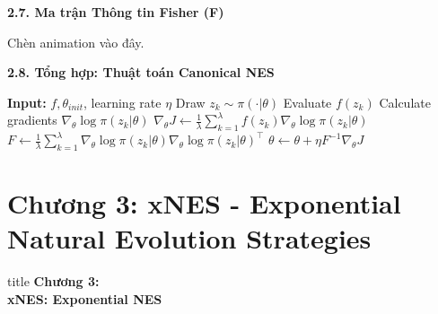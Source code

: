 \documentclass[10pt,xcolor=dvipsnames]{beamer}
\begin{document}
\begin{frame}{\textbf{2.7. Ma trận Thông tin Fisher (F)}}
	\begin{center}
		Chèn animation vào đây.
	\end{center}
\end{frame}

\begin{frame}{\textbf{2.8. Tổng hợp: Thuật toán Canonical NES}}
	\begin{algorithm}[H]
		\begin{algorithmic}[1]
			\STATE \textbf{Input:} $f, \theta_{init}$, learning rate $\eta$
			\REPEAT
			\STATE Draw $z_k \sim \pi(\cdot|\theta)$
			\STATE Evaluate $f(z_k)$
			\STATE Calculate gradients $\nabla_\theta \log \pi(z_k|\theta)$
			\ENDFOR
			\STATE $\nabla_\theta J \leftarrow \frac{1}{\lambda} \sum_{k=1}^\lambda f(z_k) \nabla_\theta \log \pi(z_k|\theta)$
			\STATE $F \leftarrow \frac{1}{\lambda} \sum_{k=1}^\lambda \nabla_\theta \log \pi(z_k|\theta) \nabla_\theta \log \pi(z_k|\theta)^\top$
			\STATE $\theta \leftarrow \theta + \eta F^{-1} \nabla_\theta J$ 
		\end{algorithmic}
		\caption{Canonical Natural Evolution Strategies}
	\end{algorithm}
\end{frame}
\section{Chương 3: xNES - Exponential Natural Evolution Strategies}

\begin{frame}
	\centering
	\begin{beamercolorbox}[sep=16pt,center,shadow=true,rounded=true]{title}
		\huge \textbf{Chương 3:\\[0.5em] xNES: Exponential NES} \par
	\end{beamercolorbox}
\end{frame}
\end{document}

